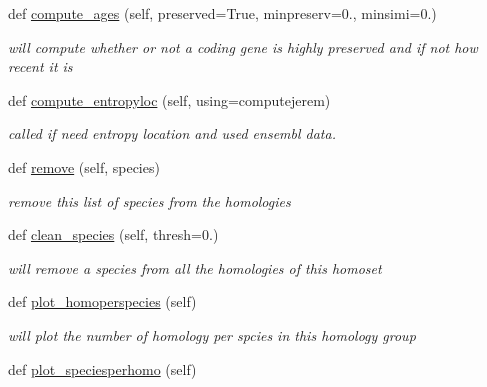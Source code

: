 \begin{DoxyCompactItemize}
def \mbox{\hyperlink{class_py_c_u_b_1_1homoset_1_1_homo_set_a59a0c4c70f6dbd2dd156e2b2c9b00421}{compute\+\_\+ages}} (self, preserved=True, minpreserv=0., minsimi=0.)
\begin{DoxyCompactList}\small\item\em will compute whether or not a coding gene is highly preserved and if not how recent it is \end{DoxyCompactList}\item 
def \mbox{\hyperlink{class_py_c_u_b_1_1homoset_1_1_homo_set_a78ab39ddfa288661f5e809ea0a455187}{compute\+\_\+entropyloc}} (self, using=\textquotesingle{}computejerem\textquotesingle{})
\begin{DoxyCompactList}\small\item\em called if need entropy location and used ensembl data. \end{DoxyCompactList}\item 
def \mbox{\hyperlink{class_py_c_u_b_1_1homoset_1_1_homo_set_af19ffd1cceb4b222e642713456b300a1}{remove}} (self, species)
\begin{DoxyCompactList}\small\item\em remove this list of species from the homologies \end{DoxyCompactList}\item 
def \mbox{\hyperlink{class_py_c_u_b_1_1homoset_1_1_homo_set_a2062c7f9c3c956d43172e1688504826a}{clean\+\_\+species}} (self, thresh=0.)
\begin{DoxyCompactList}\small\item\em will remove a species from all the homologies of this homoset \end{DoxyCompactList}\item 
\mbox{\label{class_py_c_u_b_1_1homoset_1_1_homo_set_a2b4bf6cef1b2545373be7ef11c329796}} 
def \mbox{\hyperlink{class_py_c_u_b_1_1homoset_1_1_homo_set_a2b4bf6cef1b2545373be7ef11c329796}{plot\+\_\+homoperspecies}} (self)
\begin{DoxyCompactList}\small\item\em will plot the number of homology per spcies in this homology group \end{DoxyCompactList}\item 
\mbox{\label{class_py_c_u_b_1_1homoset_1_1_homo_set_a2cd71ff76ae8cd4ed1bdc206346942d4}} 
def \mbox{\hyperlink{class_py_c_u_b_1_1homoset_1_1_homo_set_a2cd71ff76ae8cd4ed1bdc206346942d4}{plot\+\_\+speciesperhomo}} (self)

\end{DoxyCompactItemize}
